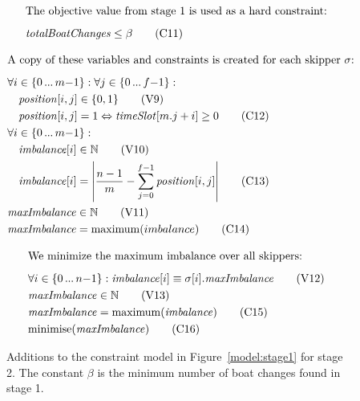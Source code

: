 \documentclass{llncs}
\newcommand{\timeSlot}{\mathit{timeSlot}}
\newcommand{\totalBoatChanges}{\mathit{totalBoatChanges}}
\newcommand{\position}{\mathit{position}}
\newcommand{\imbalance}{\mathit{imbalance}}
\newcommand{\maxImbalance}{\mathit{maxImbalance}}
\newcommand{\minimise}{\mathrm{minimise}}
\newcommand{\maximum}{\mathrm{maximum}}
\DeclarePairedDelimiter\abs{\lvert}{\rvert}
\newcommand\nldots{\,\hbox to 0.8em{.\hss.\hss.}\,}
\begin{document}
{\begin{figure}[p]
\setlength{\mathindent}{1em}
\setlength{\abovedisplayskip}{0pt}
\setlength{\belowdisplayskip}{0pt}
\setlength{\abovecaptionskip}{0pt}
\begin{framed}
\begin{align}
    \intertext{The objective value from stage 1 is used as a hard constraint:\smallskip}
    & \totalBoatChanges \leq \beta \tag{C11} \label{C11}
\end{align}
\end{framed}\begin{framed}
\begin{align}
    \intertext{A copy of these variables and constraints is created for each skipper $\sigma$:\smallskip}
    & \forall i \in \{ 0 \nldots m{-}1 \} : \forall j \in \{ 0 \nldots f{-}1 \} : \nonumber \\
    & \hspace*{1em} \position[{i,j}] \in \{0,1\} \tag{V9} \label{V9} \\
    & \hspace*{1em} \position[{i,j}] = 1 \Leftrightarrow \timeSlot[{m.j+i}] \geq 0 \tag{C12} \label{C12} \\
    & \forall i \in \{ 0 \nldots m{-}1 \} : \nonumber \\
    & \hspace*{1em} \imbalance[{i}] \in \mathbb{N} \label{V10} \tag{V10} \\
    & \hspace*{1em} \imbalance[{i}] = \abs*{\frac{n-1}{m} - \sum_{j=0}^{f-1} \position[{i,j}]} \label{C13} \tag{C13} \\
    & \maxImbalance \in \mathbb{N} \label{V11} \tag{V11} \\
    & \maxImbalance = \maximum(imbalance) \label{C14} \tag{C14}
\end{align}
\end{framed}\begin{framed}
\begin{align}
    \intertext{We minimize the maximum imbalance over all skippers:\smallskip}
    & \forall i \in \{ 0 \nldots n{-}1 \} : \imbalance[{i}] \equiv \sigma[{i}].\maxImbalance \label{V12} \tag{V12} \\
    & \maxImbalance \in \mathbb{N} \label{V13} \tag{V13} \\
    & \maxImbalance = \maximum(\imbalance) \label{C15} \tag{C15} \\
    & \minimise(\maxImbalance) \label{C16} \tag{C16}
\end{align}
\end{framed}
\caption{Additions to the constraint model in Figure~\ref{model:stage1} for stage 2. The constant
$\beta$ is the minimum number of boat changes found in stage 1.}\label{model:stage2}
\end{figure}

}
\end{document}
